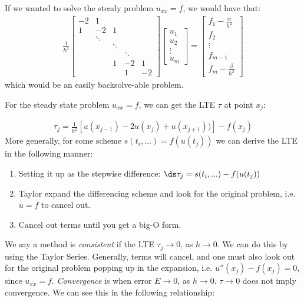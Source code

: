 \documentclass{article}
\begin{document}
If we wanted to solve the steady problem $u_{xx} = f$, we would have that:
\begin{align*}
  \frac{1}{h^2} \begin{bmatrix}
    -2 & 1 & & & \\
    1 & -2 & 1 & & \\
       & \ddots &  & & \\
       &  & \ddots &  & \\
       & &  & \ddots &  \\
       & & 1 & -2 & 1\\
       & & & 1 & -2
  \end{bmatrix}
  \begin{bmatrix}
    u_1\\
    u_2\\
    \vdots\\
    u_m
  \end{bmatrix}
  =
  \begin{bmatrix}
    f_1 - \frac{\alpha}{h^2}\\
    f_2\\
    \vdots\\
    f_{m-1}\\
    f_m - \frac{\beta}{h^2}
  \end{bmatrix}
\end{align*}
which would be an easily backsolve-able problem.

 For the steady state problem $u_{xx} = f$, we can get the LTE $\tau$ at point $x_j$:

\begin{align*}
  \tau_j = \frac{1}{h^2} \left[u(x_{j-1}) - 2u(x_j) + u(x_{j + 1}))\right] - f(x_j)
\end{align*}
More generally, for some scheme $s(t_i, ...) = f(u(t_j))$ we can derive the LTE in the following manner:
\begin{enumerate}
\item Setting it up as the stepwise difference: $\ds \tau_j = s(t_i, ...) - f(u(t_j))$
\item Taylor expand the differencing scheme and look for the original problem, i.e. $u = f$ to cancel out.
\item Cancel out terms until you get a big-O form.
\end{enumerate}
 We say a method is \textit{consistent} if the LTE $\tau_j \to 0$, as $h \to 0$. We can do this by using the Taylor Series. Generally, terms will cancel, and one must also look out for the original problem popping up in the expansion, i.e. $u''(x_j) - f(x_j) = 0$, since $u_{xx} = f$.
\gap
{} \textit{Convergence} is when error $E \to 0$, as $h \to 0$. $\tau \to 0$ does not imply convergence. We can see this in the following relationship:
\end{document}
